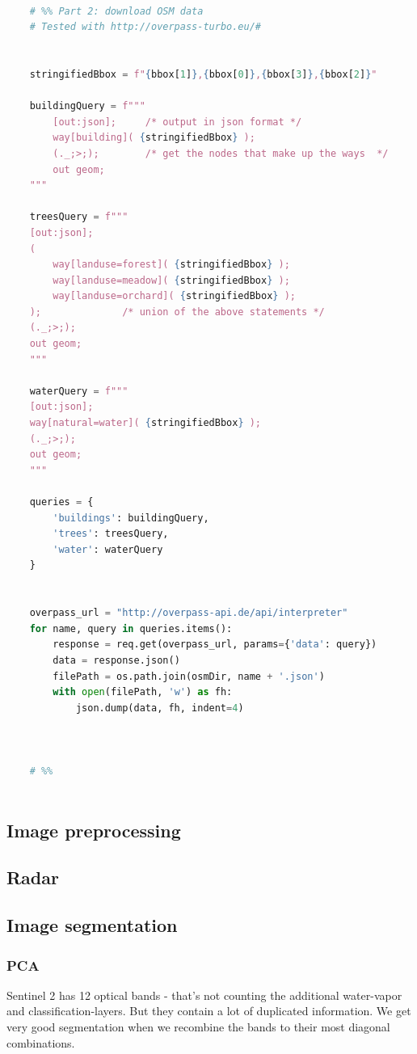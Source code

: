 \begin{lstlisting}[language=python]
    
    # %% Part 2: download OSM data
    # Tested with http://overpass-turbo.eu/#
    
    
    stringifiedBbox = f"{bbox[1]},{bbox[0]},{bbox[3]},{bbox[2]}"
    
    buildingQuery = f"""
        [out:json];     /* output in json format */
        way[building]( {stringifiedBbox} );
        (._;>;);        /* get the nodes that make up the ways  */
        out geom;
    """
    
    treesQuery = f"""
    [out:json];
    (
        way[landuse=forest]( {stringifiedBbox} );
        way[landuse=meadow]( {stringifiedBbox} );
        way[landuse=orchard]( {stringifiedBbox} );
    );              /* union of the above statements */
    (._;>;);
    out geom;
    """
    
    waterQuery = f"""
    [out:json];
    way[natural=water]( {stringifiedBbox} );
    (._;>;);
    out geom;
    """
    
    queries = {
        'buildings': buildingQuery,
        'trees': treesQuery,
        'water': waterQuery
    }
    
    
    overpass_url = "http://overpass-api.de/api/interpreter"
    for name, query in queries.items():
        response = req.get(overpass_url, params={'data': query})
        data = response.json()
        filePath = os.path.join(osmDir, name + '.json')
        with open(filePath, 'w') as fh:
            json.dump(data, fh, indent=4)
    
    
    
    # %%
    
\end{lstlisting}


\subsection{Image preprocessing}
\subsubsection{}
\subsection{Radar}
\subsection{Image segmentation}


\subsubsection{PCA}
Sentinel 2 has 12 optical bands - that's not counting the additional water-vapor and classification-layers.
But they contain a lot of duplicated information.
We get very good segmentation when we recombine the bands to their most diagonal combinations.


